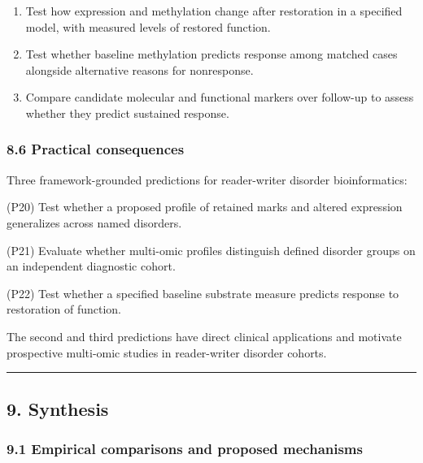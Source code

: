 \documentclass[
]{article}
\begin{document}
\begin{enumerate}
\def\labelenumi{(\roman{enumi})}
\item
  Test how expression and methylation change after restoration in a
  specified model, with measured levels of restored function.
\item
  Test whether baseline methylation predicts response among matched
  cases alongside alternative reasons for nonresponse.
\item
  Compare candidate molecular and functional markers over follow-up to
  assess whether they predict sustained response.
\end{enumerate}

\hypertarget{practical-consequences-6}{%
\subsubsection{8.6 Practical
consequences}\label{practical-consequences-6}}

Three framework-grounded predictions for reader-writer disorder
bioinformatics:

(P20) Test whether a proposed profile of retained marks and altered
expression generalizes across named disorders.

(P21) Evaluate whether multi-omic profiles distinguish defined disorder
groups on an independent diagnostic cohort.

(P22) Test whether a specified baseline substrate measure predicts
response to restoration of function.

The second and third predictions have direct clinical applications and
motivate prospective multi-omic studies in reader-writer disorder
cohorts.

\begin{center}\rule{0.5\linewidth}{0.5pt}\end{center}

\hypertarget{synthesis}{%
\subsection{9. Synthesis}\label{synthesis}}

\hypertarget{empirical-comparisons-and-proposed-mechanisms}{%
\subsubsection{9.1 Empirical comparisons and proposed
mechanisms}\label{empirical-comparisons-and-proposed-mechanisms}}
\end{document}
